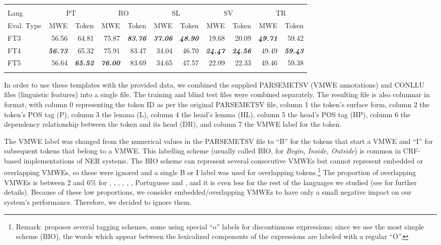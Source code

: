 \documentclass[output=paper,modfonts,nonflat]{langsci/langscibook}
\begin{document}
\begin{table}
{\begin{tabular}{lrrrrrrrrrr}
\lspbottomrule
 & &&&&&&&&&  \tabularnewline
\lsptoprule
{Lang }& \multicolumn{2}{c}{{PT}} & \multicolumn{2}{c}{{RO}} & \multicolumn{2}{c}{{SL}} & \multicolumn{2}{c}{{SV}} & \multicolumn{2}{c}{{TR}}  \tabularnewline
{Eval. Type} & {MWE} & {Token} & {MWE} & {Token} & {MWE} & {Token} & {MWE} & {Token} & {MWE} & {Token}   \tabularnewline
\midrule
{FT3} & {56.56} & {64.81} & {75.87} & \textbf{\emph{83.76}}  & \textbf{\emph{37.06}}  & \textbf{\emph{48.90}}  & {19.68} & {20.09} & \textbf{\emph{49.71}}  & {59.42}    \tabularnewline
{FT4}  & \textbf{\emph{56.73}}  & {65.32} & {75.91} & {83.47} & {34.04} & {46.70} & \textbf{\emph{24.47}}  & \textbf{\emph{24.56}}  & {49.49} & \textbf{\emph{59.43}}{}   \tabularnewline
{FT5}  & {56.64} & \textbf{\emph{65.52}}{} & \textbf{\emph{76.00}}  & {83.69} & {34.65} & {47.57} & {22.09} & {22.33} & {49.46} & {59.38}    \tabularnewline
\lspbottomrule
\end{tabular}
}
\end{table}

  
In order to use these templates with the provided data, we combined
the supplied PARSEMETSV (VMWE annotations) and CONLLU files
(linguistic features) into a single file. The training and blind test
files were combined separately. The resulting file is also columnar in
format, with column 0 representing the token ID as per the original
PARSEMETSV file, column 1 the token's surface form, column 2 the
token's POS tag (P), column 3 the lemma (L), column 4 the head's
lemma (HL), column 5 the head's POS tag (HP), column 6 the
dependency relationship between the token and its head (DR), and column 7
the VMWE label for the token. 

The VMWE label was changed from the
numerical values in the PARSEMETSV file to ``B'' for the tokens that
start a VMWE and ``I'' for subsequent tokens that belong to a
VMWE. This labelling scheme (usually called BIO, for {\em Begin,
Inside, Outside}) is common in CRF-based implementations of
NER systems. The BIO scheme can represent several
consecutive VMWEs but cannot represent embedded or overlapping VMWEs, so
these were ignored and a single B or I label was used for overlapping
tokens.\footnote{Remark: \cite{Schneider14b} proposes several tagging schemes, some using special ``o'' labels for discontinuous expressions; since we use the most simple scheme (BIO), the words which appear between the lexicalized components of the expressions are labeled with a regular ``O''.} %
The proportion of overlapping VMWEs is between 2 and 6\% for , , , , , , Portuguese and ,
and it is even less for the rest of the languages we studied (see  for further details).
Because of these low proportions, we consider embedded/overlapping VMWEs to have only a small negative impact on our system's performance. Therefore, we decided to ignore them.
\end{document}
